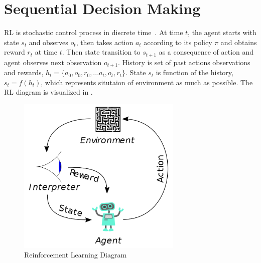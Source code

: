 \section{Sequential Decision Making}
\label{sec:decision_making}

RL is stochastic control process in discrete time~\cite{sutton_reinforcement_1998}. 
At time $t$, the agent starts with state $s_t$ and observes $o_t$, 
then takes action $a_t$ according to its policy $\pi$ and obtains reward $r_t$ at time $t$. 
Then state transition to $s_{t+1}$ as a consequence of action and agent observes next observation $o_{t+1}$. 
History is set of past actions observations and rewards, $h_t=\{ a_0, o_0, r_0, ... a_t, o_t, r_t\}$. 
State $s_t$ is function of the history, $s_t=f(h_t)$, which represents situtaion of environment as much as possible. 
The RL diagram is visualized in . 
\begin{figure}
	\centering
	\includegraphics[width=0.7\textwidth]{figures/ml_theory/RL_diagram.png}
	\caption{Reinforcement Learning Diagram}
	\label{fig:rl_diagram}
\end{figure}